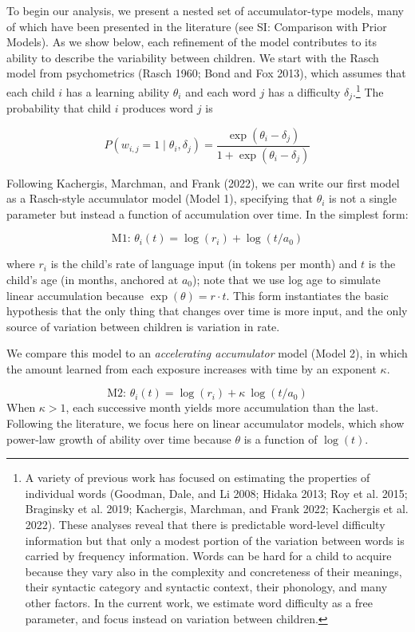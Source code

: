\documentclass[
  11pt,
]{article}
\begin{document}
To begin our analysis, we present a nested set of accumulator-type
models, many of which have been presented in the literature (see SI:
Comparison with Prior Models). As we show below, each refinement of the
model contributes to its ability to describe the variability between
children. We start with the Rasch model from psychometrics (Rasch 1960;
Bond and Fox 2013), which assumes that each child \(i\) has a learning
ability \(\theta_i\) and each word \(j\) has a difficulty
\(\delta_j\).\footnote{A variety of previous work has focused on
  estimating the properties of individual words (Goodman, Dale, and Li
  2008; Hidaka 2013; Roy et al. 2015; Braginsky et al. 2019; Kachergis,
  Marchman, and Frank 2022; Kachergis et al. 2022). These analyses
  reveal that there is predictable word-level difficulty information but
  that only a modest portion of the variation between words is carried
  by frequency information. Words can be hard for a child to acquire
  because they vary also in the complexity and concreteness of their
  meanings, their syntactic category and syntactic context, their
  phonology, and many other factors. In the current work, we estimate
  word difficulty as a free parameter, and focus instead on variation
  between children.} The probability that child \(i\) produces word
\(j\) is

\[P(w_{i,j}=1 \mid \theta_i, \delta_j) =\frac{\exp(\theta_i - \delta_j)}{1 + \exp(\theta_i - \delta_j)}\]

Following Kachergis, Marchman, and Frank (2022), we can write our first
model as a Rasch-style accumulator model (Model 1), specifying that
\(\theta_i\) is not a single parameter but instead a function of
accumulation over time. In the simplest form:

\[\text{M1: }\theta_i(t)  = \log(r_i) + \log(t/a_0)\]

\noindent where \(r_i\) is the child's rate of language input (in tokens
per month) and \(t\) is the child's age (in months, anchored at
\(a_0\)); note that we use log age to simulate linear accumulation
because \(\exp(\theta) = r \cdot t\). This form instantiates the basic
hypothesis that the only thing that changes over time is more input, and
the only source of variation between children is variation in rate.

We compare this model to an \emph{accelerating accumulator} model (Model
2), in which the amount learned from each exposure increases with time
by an exponent \(\kappa\).

\[\text{M2: }\theta_i(t)  = \log(r_i) + \kappa ~ \log(t/a_0)\]
\noindent When \(\kappa>1\), each successive month yields more
accumulation than the last. Following the literature, we focus here on
linear accumulator models, which show power-law growth of ability over
time because \(\theta\) is a function of \(\log(t)\).
\end{document}
